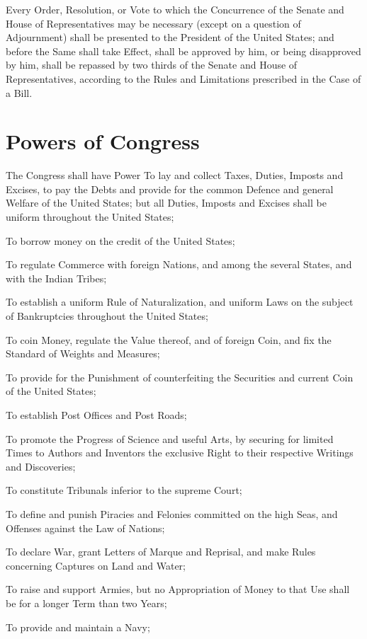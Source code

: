 \documentclass{constitution}
\begin{document}
Every Order, Resolution, or Vote to which the Concurrence
of the Senate and House of Representatives may be necessary
(except on a question of Adjournment)
shall be presented to the President of the United States;
and before the Same shall take Effect, shall be approved by him,
or being disapproved by him,
shall be repassed by two thirds of the Senate and House of Representatives,
according to the Rules and Limitations prescribed in the Case of a Bill.

\section{Powers of Congress}
The Congress shall have Power
To lay and collect Taxes, Duties, Imposts and Excises,
to pay the Debts and provide for the common Defence and general Welfare of the United States;
but all Duties, Imposts and Excises shall be uniform throughout the United States;

To borrow money on the credit of the United States;

To regulate Commerce with foreign Nations,
and among the several States,
and with the Indian Tribes;

To establish a uniform Rule of Naturalization,
and uniform Laws on the subject of Bankruptcies
throughout the United States;

To coin Money, regulate the Value thereof, and of foreign Coin,
and fix the Standard of Weights and Measures;

To provide for the Punishment of counterfeiting
the Securities and current Coin of the United States;

To establish Post Offices and Post Roads;

To promote the Progress of Science and useful Arts,
by securing for limited Times to Authors and Inventors
the exclusive Right to their respective Writings and Discoveries;

To constitute Tribunals inferior to the supreme Court;

To define and punish Piracies and Felonies committed on the high Seas,
and Offenses against the Law of Nations;

To declare War, grant Letters of Marque and Reprisal,
and make Rules concerning Captures on Land and Water;

To raise and support Armies,
but no Appropriation of Money to that Use shall be for a longer Term than two Years;

To provide and maintain a Navy;
\end{document}
